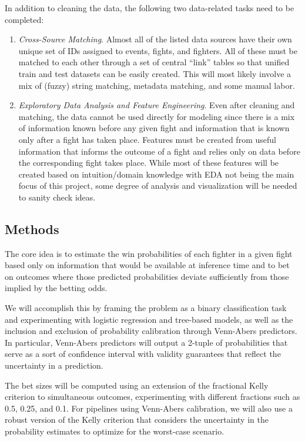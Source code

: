 \documentclass[
  letterpaper,
  DIV=11,
  numbers=noendperiod]{scrartcl}
\begin{document}
In addition to cleaning the data, the following two data-related tasks need to be completed:
\begin{enumerate}
    \item \textit{Cross-Source Matching}. Almost all of the listed data sources have their own unique set of IDs assigned to events, fights, and fighters. All of these must be matched to each other through a set of central ``link'' tables so that unified train and test datasets can be easily created. This will most likely involve a mix of (fuzzy) string matching, metadata matching, and some manual labor.
    \item \textit{Exploratory Data Analysis and Feature Engineering}. Even after cleaning and matching, the data cannot be used directly for modeling since there is a mix of information known before any given fight and information that is known only after a fight has taken place. Features must be created from useful information that informs the outcome of a fight and relies only on data before the corresponding fight takes place. While most of these features will be created based on intuition/domain knowledge with EDA not being the main focus of this project, some degree of analysis and visualization will be needed to sanity check ideas.
\end{enumerate}


\subsection{Methods}\label{methods}

The core idea is to estimate the win probabilities of each fighter in a given fight based only on information that would be available at inference time and to bet on outcomes where those predicted probabilities deviate sufficiently from those implied by the betting odds.

We will accomplish this by framing the problem as a binary classification task and experimenting with logistic regression and tree-based models, as well as the inclusion and exclusion of probability calibration through Venn-Abers predictors. In particular, Venn-Abers predictors will output a 2-tuple of probabilities that serve as a sort of confidence interval with validity guarantees that reflect the uncertainty in a prediction.

The bet sizes will be computed using an extension of the fractional Kelly criterion to simultaneous outcomes, experimenting with different fractions such as 0.5, 0.25, and 0.1. For pipelines using Venn-Abers calibration, we will also use a robust version of the Kelly criterion that considers the uncertainty in the probability estimates to optimize for the worst-case scenario.
\end{document}
